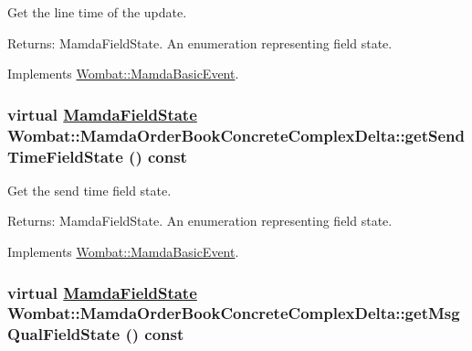 Get the line time of the update. 

\begin{Desc}
\item[Returns:]Mamda\-Field\-State. An enumeration representing field state. \end{Desc}


Implements \hyperlink{classWombat_1_1MamdaBasicEvent_eb06352aca3280c5e89bad7a3b185cdf}{Wombat::Mamda\-Basic\-Event}.\hypertarget{classWombat_1_1MamdaOrderBookConcreteComplexDelta_a15e8f6d486cd6748799f064ae2955fd}{
\subsubsection[getSendTimeFieldState]{\setlength{\rightskip}{0pt plus 5cm}virtual \hyperlink{namespaceWombat_93aac974f2ab713554fd12a1fa3b7d2a}{Mamda\-Field\-State} Wombat::Mamda\-Order\-Book\-Concrete\-Complex\-Delta::get\-Send\-Time\-Field\-State () const}}
\label{classWombat_1_1MamdaOrderBookConcreteComplexDelta_a15e8f6d486cd6748799f064ae2955fd}


Get the send time field state. 

\begin{Desc}
\item[Returns:]Mamda\-Field\-State. An enumeration representing field state. \end{Desc}


Implements \hyperlink{classWombat_1_1MamdaBasicEvent_418ecb29b412cd42581b54c87b5360fd}{Wombat::Mamda\-Basic\-Event}.\hypertarget{classWombat_1_1MamdaOrderBookConcreteComplexDelta_cf10f3c525a296a751d1b0dbf65d2a0b}{
\subsubsection[getMsgQualFieldState]{\setlength{\rightskip}{0pt plus 5cm}virtual \hyperlink{namespaceWombat_93aac974f2ab713554fd12a1fa3b7d2a}{Mamda\-Field\-State} Wombat::Mamda\-Order\-Book\-Concrete\-Complex\-Delta::get\-Msg\-Qual\-Field\-State () const}}
\label{classWombat_1_1MamdaOrderBookConcreteComplexDelta_cf10f3c525a296a751d1b0dbf65d2a0b}


